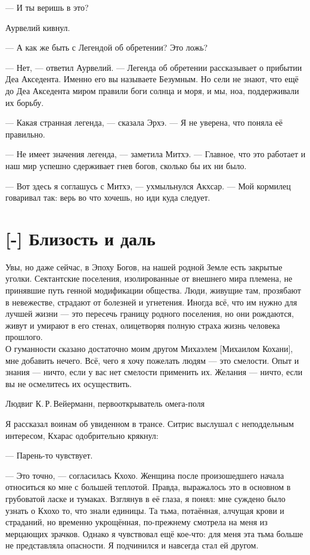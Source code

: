 --- И ты веришь в это?

Аурвелий кивнул.

--- А как же быть с Легендой об обретении?
Это ложь?

--- Нет, --- ответил Аурвелий.
--- Легенда об обретении рассказывает о прибытии Деа Акседента.
Именно его вы называете Безумным.
Но сели не знают, что ещё до Деа Акседента миром правили боги солнца и моря, и мы, ноа, поддерживали их борьбу.

--- Какая странная легенда, --- сказала Эрхэ.
--- Я не уверена, что поняла её правильно.

--- Не имеет значения легенда, --- заметила Митхэ.
--- Главное, что это работает и наш мир успешно сдерживает гнев богов, сколько бы их ни было.

--- Вот здесь я соглашусь с Митхэ, --- ухмыльнулся Акхсар.
--- Мой кормилец говаривал так: верь во что хочешь, но иди куда следует.

\section{[-] Близость и даль}

\epigraph
{Увы, но даже сейчас, в Эпоху Богов, на нашей родной Земле есть закрытые уголки.
Сектантские поселения, изолированные от внешнего мира племена, не принявшие путь генной модификации общества.
Люди, живущие там, прозябают в невежестве, страдают от болезней и угнетения.
Иногда всё, что им нужно для лучшей жизни --- это пересечь границу родного поселения, но они рождаются, живут и умирают в его стенах, олицетворяя полную страха жизнь человека прошлого.\\
О гуманности сказано достаточно моим другом Михаэлем [Михаилом Кохани], мне добавить нечего.
Всё, чего я хочу пожелать людям --- это смелости.
Опыт и знания --- ничто, если у вас нет смелости применить их.
Желания --- ничто, если вы не осмелитесь их осуществить.}
{Людвиг К.\,Р.\,Вейерманн, первооткрыватель омега-поля}

\textspace

Я рассказал воинам об увиденном в трансе.
Ситрис выслушал с неподдельным интересом, Кхарас одобрительно крякнул:

--- Парень-то чувствует.

--- Это точно, --- согласилась Кхохо.
Женщина после произошедшего начала относиться ко мне с большей теплотой.
Правда, выражалось это в основном в грубоватой ласке и тумаках.
Взглянув в её глаза, я понял: мне суждено было узнать о Кхохо то, что знали единицы.
Та тьма, потаённая, алчущая крови и страданий, но временно укрощённая, по-прежнему смотрела на меня из мерцающих зрачков.
Однако я чувствовал ещё кое-что: для меня эта тьма больше не представляла опасности.
Я подчинился и навсегда стал ей другом.


